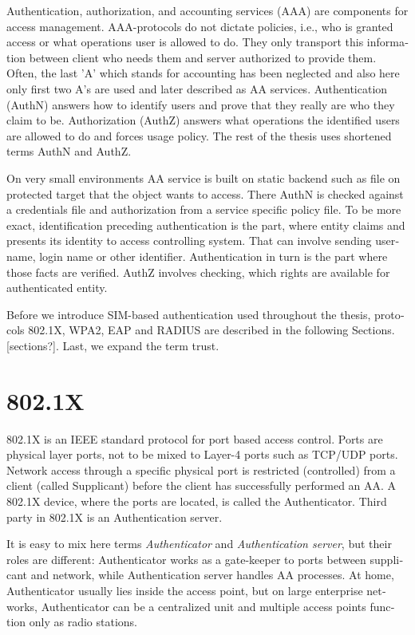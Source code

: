 \documentclass[12pt,a4paper,english]{tutthesis}
\begin{document}
\begin{otherlanguage}{english}
Authentication, authorization, and accounting services (AAA) are
components for access management.  AAA-protocols do not dictate
policies, i.e., who is granted access or what operations user is
allowed to do. They only transport this information between client
who needs them and server authorized to provide them.
Often, the last 'A' which stands for accounting has been neglected
and also here only first two A's are used and later described as AA
services. Authentication (AuthN) answers how to identify users and
prove that they really are who they claim to be. Authorization (AuthZ)
answers what operations the identified users are allowed to do and
forces usage policy. The rest of the thesis uses shortened terms AuthN
and AuthZ.

On very small environments AA service is built on static backend such
as file on protected target that the object wants to access. There AuthN
is checked against a credentials file and authorization from a service
specific policy file. 
To be more exact, identification preceding authentication is the part,
where entity claims and presents its identity to 
access controlling system. That can involve sending username, login
name or other identifier. Authentication in turn is the part where
those facts are verified. AuthZ involves checking, which rights are 
available for authenticated entity. 


Before we introduce SIM-based authentication used throughout the
thesis, protocols 802.1X, WPA2, EAP and RADIUS are described in the
following Sections. [sections?]. Last, we expand the term trust.

\section{802.1X}
\label{sec-2-1}

802.1X\cite{8021X} is an IEEE standard protocol for port based access
control. Ports are physical layer ports, not to be mixed to Layer-4 ports such as TCP/UDP ports.
 Network access through a specific physical port is
restricted (controlled) from a client (called Supplicant) before
the client has successfully performed an AA. A 802.1X device, where
the ports are located, is called the Authenticator. Third party in 802.1X is an
Authentication server. 



It is easy to mix here terms \emph{Authenticator} and \emph{Authentication
server}, but their roles are different: Authenticator works as a
gate-keeper to ports between supplicant and network, while
Authentication server handles AA processes.
At home, Authenticator usually lies inside the access point, but 
on large enterprise networks, Authenticator can be a centralized unit 
and multiple access points function only as radio stations.




\end{otherlanguage}
\end{document}
